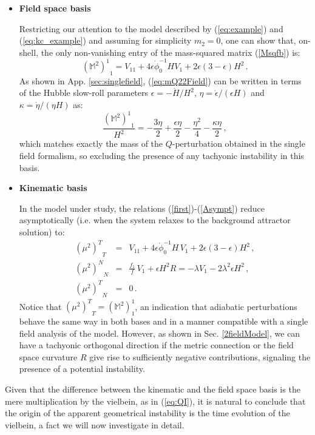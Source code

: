\documentclass[a4paper,11pt]{article}
\def\be{\begin{equation}}
\def\ee{\end{equation}}
\def\bea{\begin{eqnarray}}
\def\eea{\end{eqnarray}}
\begin{document}
\begin{itemize}
\item \textbf{Field space basis}

Restricting our attention to the model described by (\ref{eq:example}) and (\ref{eq:kc_example}) and assuming for simplicity $m_2=0$, one can show that, on-shell, the only non-vanishing entry of the mass-squared matrix (\ref{Msqfb}) is:
\be
{\left(\mathbb{M}^2\right)^1}_1= V_{11}+4\epsilon \dot\phi_0^{-1} H V_1+2\epsilon(3-\epsilon) H^2\,.
\label{eq:mQ22Field}
\ee
As shown in App. \ref{sec:singlefield}, (\ref{eq:mQ22Field}) can be written in terms of the Hubble slow-roll parameters $\epsilon=-\dot{H}/H^2$, $\eta = \dot\epsilon/(\epsilon H)$ and $\kappa = \dot\eta/(\eta H)$ as:
\be
\frac{{\left(\mathbb{M}^2\right)^1}_1}{H^2}=-\frac{3 \eta}{2}+\frac{\epsilon \eta}{2}-\frac{\eta^2}{4}-\frac{\kappa \eta}{2}\,,
\ee
which matches exactly the mass of the $Q$-perturbation obtained in the single field formalism, so excluding the presence of any tachyonic instability in this basis. 

\item \textbf{Kinematic basis}

In the model under study, the relations (\ref{first})-(\ref{Asympt}) reduce asymptotically (i.e. when the system relaxes to the background attractor solution) to:
\bea
{\left(\mu^2\right )^T}_T&=& V_{11}+ 4\epsilon \dot\phi_0^{-1} H\,V_1+2 \epsilon(3-\epsilon) H^2\,, \\
\label{eq:TachyonicMass}
{\left(\mu^2\right )^N}_N&=& \frac{f_1}{f}\,V_1 +\epsilon H^2 R = -\lambda V_1 -2 \lambda^2 \epsilon H^2\,, \\
{\left(\mu^2\right )^T}_N&=&0\,.
\eea
Notice that ${\left(\mu^2\right )^T}_T=(\mathbb{M}^2)^1_1$, an indication that adiabatic perturbations behave the same way in both bases and in a manner compatible with a single field analysis of the model. However, as shown in Sec. \ref{2fieldModel}, we can have a tachyonic orthogonal direction if the metric connection or the field space curvature $R$ give rise to sufficiently negative contributions, signaling the presence of a potential instability. 
\end{itemize}

Given that the difference between the kinematic and the field space basis is the mere multiplication by the vielbein, as in (\ref{eq:QI}), it is natural to conclude that the origin of the apparent geometrical instability is the time evolution of the vielbein, a fact we will now investigate in detail.
\end{document}
